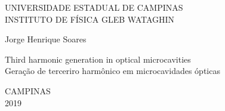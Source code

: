 \thispagestyle{empty}

\begin{figure}[httb]
\begin{center}
\end{center}
\end{figure}

\begin{center}
\begin{doublespacing}
{\large UNIVERSIDADE ESTADUAL DE CAMPINAS}\\
{\large INSTITUTO DE FÍSICA GLEB WATAGHIN}\\
\end{doublespacing}
\vspace{2cm}
Jorge Henrique Soares

\vspace{1.5cm}
{\Large Third harmonic generation in optical microcavities}\\
\vspace{1cm}
{\large Geração de terceriro harmônico em microcavidades ópticas}\\
\vspace{1cm}

\vfill

\end{center}

\vspace{3cm}
\begin{center}
CAMPINAS \\
2019 
\end{center}